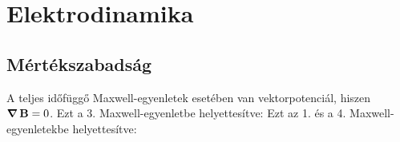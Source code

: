   
 \section{Elektrodinamika}
  
  \subsection{Mértékszabadság}\label{ss:04-mertekszabadsag}
  
   A teljes időfüggő Maxwell-egyenletek esetében van vektorpotenciál, hiszen $\mathop{\boldsymbol{\nabla}}\nolimits{\mathbf{B}}=0$. Ezt a 3. Maxwell-egyenletbe helyettesítve:
   Ezt az 1. és a 4. Maxwell-egyenletekbe helyettesítve:
   
